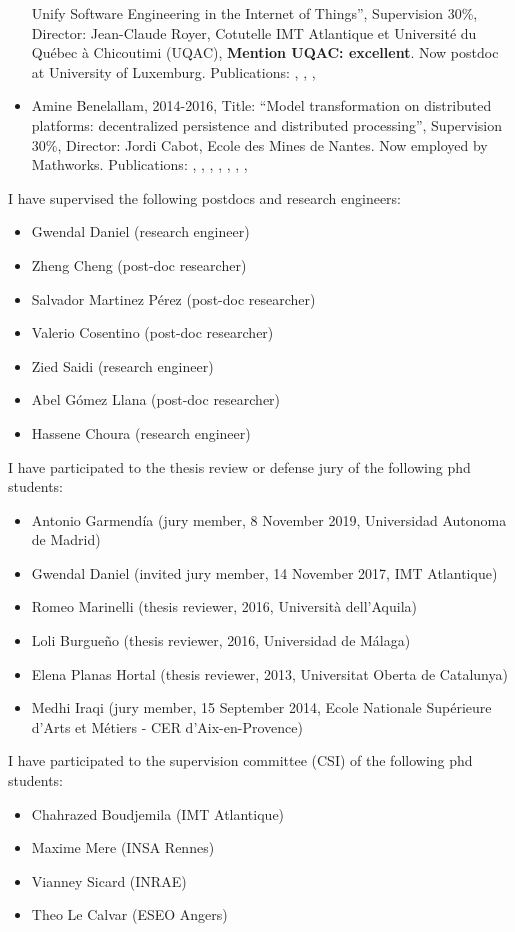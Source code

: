 \begin{itemize}
  Unify Software Engineering in the Internet of Things'', Supervision
  30\%, Director: Jean-Claude Royer, Cotutelle IMT Atlantique et Université
  du Québec à Chicoutimi (UQAC), \textbf{Mention UQAC: excellent}. Now postdoc at University of Luxemburg. Publications: \cite{berrouyneModelBasedCommunicationControl2018}, \cite{berrouyneCyprIoTFrameworkModelling2019}, \cite{berrouyneModelDrivenApproachUnravel2020}, \cite{berrouyneModelDrivenMethodologyAccelerate2022}
\item
  Amine Benelallam, 2014-2016, Title: ``Model transformation on
  distributed platforms: decentralized persistence and distributed
  processing'', Supervision 30\%, Director: Jordi Cabot, Ecole des Mines
  de Nantes. Now employed by Mathworks. Publications: \cite{Benelallam2014}, \cite{Daniel2014}, \cite{Benelallam2015}, \cite{Benelallam2015a}, \cite{Gomez2015}, \cite{benelallamEfficientModelPartitioning2016}, \cite{danielNeoEMFMultidatabaseModel2017}, \cite{benelallamDistributingRelationalModel2018} 
\end{itemize}

I have supervised the following postdocs and research engineers:

\begin{itemize}
\tightlist
\item
  Gwendal Daniel (research engineer)
\item
  Zheng Cheng (post-doc researcher)
\item
  Salvador Martinez Pérez (post-doc researcher)
\item
  Valerio Cosentino (post-doc researcher)
\item
  Zied Saidi (research engineer)
\item
  Abel Gómez Llana (post-doc researcher)
\item
  Hassene Choura (research engineer)
\end{itemize}

I have participated to the thesis review or defense jury of the
following phd students:

\begin{itemize}
\tightlist
\item
  Antonio Garmendía (jury member, 8 November 2019, Universidad Autonoma
  de Madrid)
\item
  Gwendal Daniel (invited jury member, 14 November 2017, IMT Atlantique)
\item
  Romeo Marinelli (thesis reviewer, 2016, Università dell'Aquila)
\item
  Loli Burgueño (thesis reviewer, 2016, Universidad de Málaga)
\item
  Elena Planas Hortal (thesis reviewer, 2013, Universitat Oberta de
  Catalunya)
\item
  Medhi Iraqi (jury member, 15 September 2014, Ecole Nationale
  Supérieure d'Arts et Métiers - CER d'Aix-en-Provence)
\end{itemize}

I have participated to the supervision committee (CSI) of the following
phd students:

\begin{itemize}
\tightlist
\item
  Chahrazed Boudjemila (IMT Atlantique)
\item
  Maxime Mere (INSA Rennes)
\item
  Vianney Sicard (INRAE)
\item
  Theo Le Calvar (ESEO Angers)
\end{itemize}
